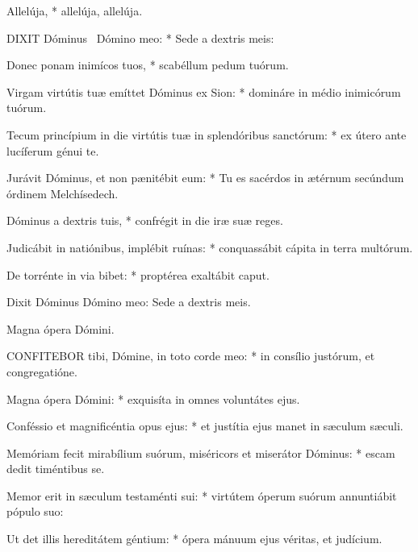 
 Allelúja, * allelúja, allelúja.




\lettrine[lines=2]{D}{IXIT} Dóminus \textdagger\ Dómino meo: * Sede a dextris meis:

Donec ponam inimícos tuos, * scabéllum pedum tuórum.

Virgam virtútis tuæ emíttet Dóminus ex Sion: * domináre in médio inimicórum tuórum.

Tecum princípium in die virtútis tuæ in splendóribus sanctórum: * ex útero ante lucíferum génui te.

Jurávit Dóminus, et non pænitébit eum: * Tu es sacérdos in ætérnum secúndum órdinem Melchísedech.

Dóminus a dextris tuis, * confrégit in die iræ suæ reges.

Judicábit in natiónibus, implébit ruínas: * conquassábit cápita in terra multórum.

De torrénte in via bibet: * proptérea exaltábit caput.

 Dixit Dóminus Dómino meo: Sede a dextris meis.

 Magna ópera Dómini.


\lettrine[lines=2]{C}{ONFITEBOR} tibi, Dómine, in toto corde meo: * in consílio justórum, et congregatióne.

Magna ópera Dómini: * exquisíta in omnes voluntátes ejus.

Conféssio et magnificéntia opus ejus: * et justítia ejus manet in sæculum sæculi.

Memóriam fecit mirabílium suórum, miséricors et miserátor Dóminus: * escam dedit timéntibus se.

Memor erit in sæculum testaménti sui: * virtútem óperum suórum annuntiábit pópulo suo:

Ut det illis hereditátem géntium: * ópera mánuum ejus véritas, et judícium.

